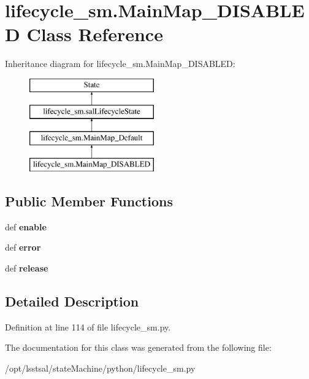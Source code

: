 \hypertarget{classlifecycle__sm_1_1_main_map___d_i_s_a_b_l_e_d}{\section{lifecycle\-\_\-sm.\-Main\-Map\-\_\-\-D\-I\-S\-A\-B\-L\-E\-D Class Reference}
\label{classlifecycle__sm_1_1_main_map___d_i_s_a_b_l_e_d}
}
Inheritance diagram for lifecycle\-\_\-sm.\-Main\-Map\-\_\-\-D\-I\-S\-A\-B\-L\-E\-D\-:\begin{figure}[H]
\begin{center}
\leavevmode
\includegraphics[height=4.000000cm]{classlifecycle__sm_1_1_main_map___d_i_s_a_b_l_e_d}
\end{center}
\end{figure}
\subsection*{Public Member Functions}
\begin{DoxyCompactItemize}
\item 
\hypertarget{classlifecycle__sm_1_1_main_map___d_i_s_a_b_l_e_d_ae4d6afdfc6cb56217ec71f02ef48ef0f}{def {\bfseries enable}}\label{classlifecycle__sm_1_1_main_map___d_i_s_a_b_l_e_d_ae4d6afdfc6cb56217ec71f02ef48ef0f}

\item 
\hypertarget{classlifecycle__sm_1_1_main_map___d_i_s_a_b_l_e_d_a10c615ab97e0e68419f7fc0730cfc93a}{def {\bfseries error}}\label{classlifecycle__sm_1_1_main_map___d_i_s_a_b_l_e_d_a10c615ab97e0e68419f7fc0730cfc93a}

\item 
\hypertarget{classlifecycle__sm_1_1_main_map___d_i_s_a_b_l_e_d_aec6ef33acd1b801fa0e052c4871c4181}{def {\bfseries release}}\label{classlifecycle__sm_1_1_main_map___d_i_s_a_b_l_e_d_aec6ef33acd1b801fa0e052c4871c4181}

\end{DoxyCompactItemize}


\subsection{Detailed Description}


Definition at line 114 of file lifecycle\-\_\-sm.\-py.



The documentation for this class was generated from the following file\-:\begin{DoxyCompactItemize}
\item 
/opt/lsstsal/state\-Machine/python/lifecycle\-\_\-sm.\-py\end{DoxyCompactItemize}
